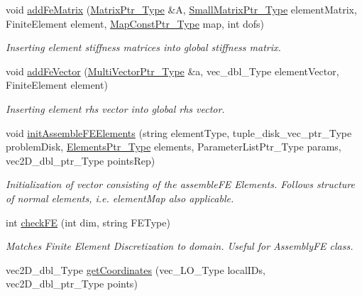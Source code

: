 \begin{DoxyCompactItemize}
\item 
void \hyperlink{classFEDD_1_1FE__Test_aae827bac5afc6e83398c187fde2dc48c}{add\+Fe\+Matrix} (\hyperlink{classFEDD_1_1FE__Test_a3c2e34afc3a1495c2b00313399f12b3d}{Matrix\+Ptr\+\_\+\+Type} \&A, \hyperlink{classFEDD_1_1FE__Test_a675b52d9e58407c6baadb403394be92b}{Small\+Matrix\+Ptr\+\_\+\+Type} element\+Matrix, Finite\+Element element, \hyperlink{classFEDD_1_1FE__Test_ad09d94cdf8e7574fc9b6d1648fa18826}{Map\+Const\+Ptr\+\_\+\+Type} map, int dofs)
\begin{DoxyCompactList}\small\item\em Inserting element stiffness matrices into global stiffness matrix. \end{DoxyCompactList}\item 
void \hyperlink{classFEDD_1_1FE__Test_a91a2d157f4967fe1b198ade0cef4d63f}{add\+Fe\+Vector} (\hyperlink{classFEDD_1_1FE__Test_ac7c0363aa74e0bfcb903c13330c50185}{Multi\+Vector\+Ptr\+\_\+\+Type} \&a, vec\+\_\+dbl\+\_\+\+Type element\+Vector, Finite\+Element element)
\begin{DoxyCompactList}\small\item\em Inserting element rhs vector into global rhs vector. \end{DoxyCompactList}\item 
void \hyperlink{classFEDD_1_1FE__Test_a5cbe33c46976b681489edf73e8b4be4d}{init\+Assemble\+F\+E\+Elements} (string element\+Type, tuple\+\_\+disk\+\_\+vec\+\_\+ptr\+\_\+\+Type problem\+Disk, \hyperlink{classFEDD_1_1FE__Test_af8f5bc3cb82c5d60a3a63b1e5c89a678}{Elements\+Ptr\+\_\+\+Type} elements, Parameter\+List\+Ptr\+\_\+\+Type params, vec2\+D\+\_\+dbl\+\_\+ptr\+\_\+\+Type points\+Rep)
\begin{DoxyCompactList}\small\item\em Initialization of vector consisting of the assemble\+FE Elements. Follows structure of \textquotesingle{}normal\textquotesingle{} elements, i.\+e. element\+Map also applicable. \end{DoxyCompactList}\item 
int \hyperlink{classFEDD_1_1FE__Test_afe37563f768c20036dd87277258b8019}{check\+FE} (int dim, string F\+E\+Type)
\begin{DoxyCompactList}\small\item\em Matches Finite Element Discretization to domain. Useful for Assembly\+FE class. \end{DoxyCompactList}\item 
vec2\+D\+\_\+dbl\+\_\+\+Type \hyperlink{classFEDD_1_1FE__Test_a60f1f1b498d11e9953349cd1ba532527}{get\+Coordinates} (vec\+\_\+\+L\+O\+\_\+\+Type local\+I\+Ds, vec2\+D\+\_\+dbl\+\_\+ptr\+\_\+\+Type points)

\end{DoxyCompactItemize}
